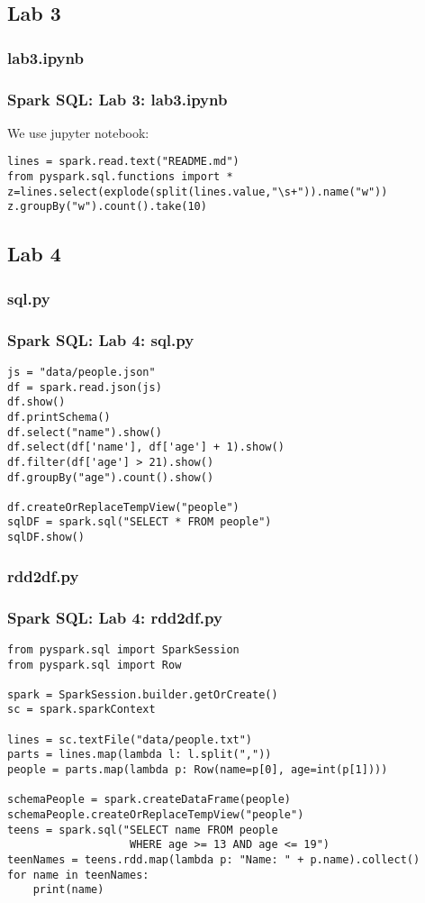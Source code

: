 \subsection{Lab 3}
\subsubsection{lab3.ipynb}
\begin{frame}[fragile]
  \frametitle{Spark SQL: Lab 3: lab3.ipynb}
  We use jupyter notebook:
{\color{mycolorcode}
\begin{verbatim}
lines = spark.read.text("README.md") 
from pyspark.sql.functions import *
z=lines.select(explode(split(lines.value,"\s+")).name("w"))
z.groupBy("w").count().take(10)
\end{verbatim}
}
\end{frame}


\subsection{Lab 4}
\subsubsection{sql.py}
\begin{frame}[fragile]
  \frametitle{Spark SQL: Lab 4: sql.py}
{\color{mycolorcode}
\begin{verbatim}
js = "data/people.json"
df = spark.read.json(js)
df.show()
df.printSchema()
df.select("name").show()
df.select(df['name'], df['age'] + 1).show()
df.filter(df['age'] > 21).show()
df.groupBy("age").count().show()

df.createOrReplaceTempView("people")
sqlDF = spark.sql("SELECT * FROM people")
sqlDF.show()
\end{verbatim}
}
\end{frame}

\subsubsection{rdd2df.py}
\begin{frame}[fragile]
  \frametitle{Spark SQL: Lab 4: rdd2df.py}
{\small
{\color{mycolorcode}
\begin{verbatim}
from pyspark.sql import SparkSession
from pyspark.sql import Row

spark = SparkSession.builder.getOrCreate()
sc = spark.sparkContext

lines = sc.textFile("data/people.txt")
parts = lines.map(lambda l: l.split(","))
people = parts.map(lambda p: Row(name=p[0], age=int(p[1])))

schemaPeople = spark.createDataFrame(people)
schemaPeople.createOrReplaceTempView("people")
teens = spark.sql("SELECT name FROM people 
                   WHERE age >= 13 AND age <= 19")
teenNames = teens.rdd.map(lambda p: "Name: " + p.name).collect()
for name in teenNames:
    print(name)
\end{verbatim}
}
}
\end{frame}

